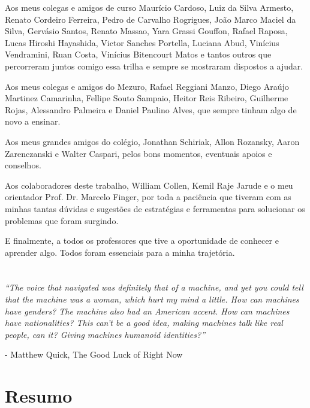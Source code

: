 \documentclass[11pt]{report}
\newcommand{\quotes}[1]{``#1''}
\begin{document}
Aos meus colegas e amigos de curso Maurício Cardoso, Luiz da Silva Armesto, Renato Cordeiro Ferreira, Pedro de Carvalho Rogrigues, João Marco Maciel da Silva,
Gervásio Santos, Renato Massao, Yara Grassi Gouffon, Rafael Raposa, Lucas Hiroshi Hayashida, Victor Sanches Portella, Luciana Abud, Vinícius Vendramini, Ruan Costa,
Vinícius Bitencourt Matos e tantos outros que percorreram juntos comigo essa trilha e sempre se mostraram dispostos a ajudar.

Aos meus colegas e amigos do Mezuro, Rafael Reggiani Manzo, Diego Araújo Martinez Camarinha, Fellipe Souto Sampaio, Heitor Reis Ribeiro, Guilherme Rojas, Alessandro Palmeira e
Daniel Paulino Alves, que sempre tinham algo de novo a ensinar.

Aos meus grandes amigos do colégio, Jonathan Schiriak, Allon Rozansky, Aaron Zarenczanski e Walter Caspari, pelos bons momentos, eventuais apoios e conselhos.

Aos colaboradores deste trabalho, William Collen, Kemil Raje Jarude e o meu orientador Prof. Dr. Marcelo Finger, por toda a paciência que tiveram com as minhas tantas dúvidas e
sugestões de estratégias e ferramentas para solucionar os problemas que foram surgindo.

E finalmente, a todos os professores que tive a oportunidade de conhecer e aprender algo. Todos foram essenciais para a minha trajetória.

\pagebreak
\thispagestyle{empty}
\chapter*{}

\vspace*{\fill}
\textit{\quotes{The voice that navigated was definitely that of a machine, and yet you could tell that the machine was a woman, which hurt my mind a little. How can machines have genders? The machine also had an American accent. How can machines have nationalities? This can't be a good idea, making machines talk like real people, can it? Giving machines humanoid identities?}}
\begin{flushright} - Matthew Quick, The Good Luck of Right Now \end{flushright}
\vspace*{\fill}

\pagebreak
\thispagestyle{empty}
\chapter*{Resumo}
\end{document}
